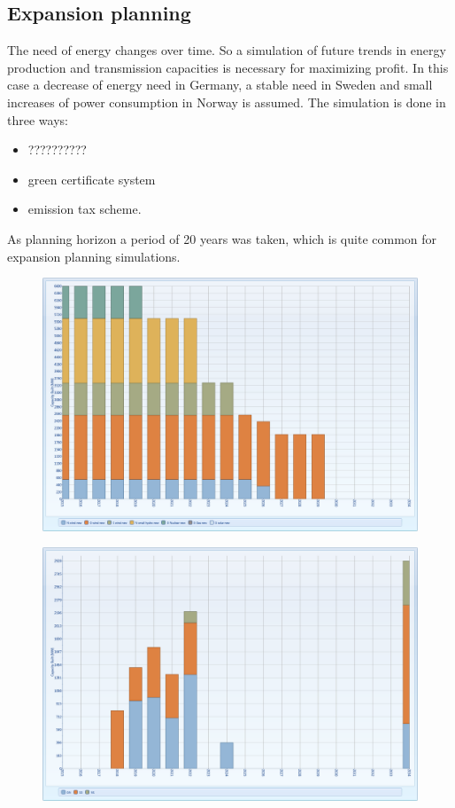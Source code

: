 \documentclass{article}
\begin{document}
\subsection{Expansion planning}
The need of energy changes over time. So a simulation of future trends in energy production and transmission capacities is necessary for maximizing profit. In this case a decrease of energy need in Germany, a stable need in Sweden and small increases of power consumption in Norway is assumed. The simulation is done in three ways:
\begin{itemize}
\item ??????????
\item green certificate system
\item emission tax scheme.
\end{itemize}
As planning horizon a period of 20 years was taken, which is quite common for expansion planning simulations.
\newpage
\begin{figure}[htbp]
\begin{center}
\includegraphics[width=13cm,keepaspectratio=true]{figures/Expansion/CapacityBuiltETGC}
\caption{}
\label{fig:CapacityBuiltETGC}
\end{center}
\end{figure}
\begin{figure}[htbp]
\begin{center}
\includegraphics[width=13cm,keepaspectratio=true]{figures/Expansion/CapacityBuiltInterfacesETGC}
\caption{}
\label{fig:CapacityBuiltInterfacesETGC}
\end{center}
\end{figure}
\end{document}
